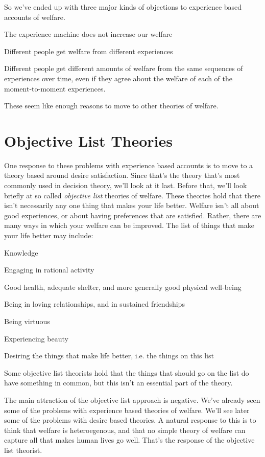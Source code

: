 So we've ended up with three major kinds of objections to experience based accounts of welfare.
\begin{itemize*}
\item The experience machine does not increase our welfare
\item Different people get welfare from different experiences
\item Different people get different amounts of welfare from the same sequences of experiences over time, even if they agree about the welfare of each of the moment-to-moment experiences.
\end{itemize*}
\noindent These seem like enough reasons to move to other theories of welfare.

\section{Objective List Theories}
One response to these problems with experience based accounts is to move to a theory based around desire satisfaction. Since that's the theory that's most commonly used in decision theory, we'll look at it last. Before that, we'll look briefly at so called \textit{objective list} theories of welfare. These theories hold that there isn't necessarily any one thing that makes your life better. Welfare isn't all about good experiences, or about having preferences that are satisfied. Rather, there are many ways in which your welfare can be improved. The list of things that make your life better may include:
\begin{itemize*}
\item Knowledge
\item Engaging in rational activity
\item Good health, adequate shelter, and more generally good physical well-being
\item Being in loving relationships, and in sustained friendships
\item Being virtuous
\item Experiencing beauty
\item Desiring the things that make life better, i.e. the things on this list
\end{itemize*}
\noindent Some objective list theorists hold that the things that should go on the list do have something in common, but this isn't an essential part of the theory.

The main attraction of the objective list approach is negative. We've already seen some of the problems with experience based theories of welfare. We'll see later some of the problems with desire based theories. A natural response to this is to think that welfare is heteroegenous, and that no simple theory of welfare can capture all that makes human lives go well. That's the response of the objective list theorist.

